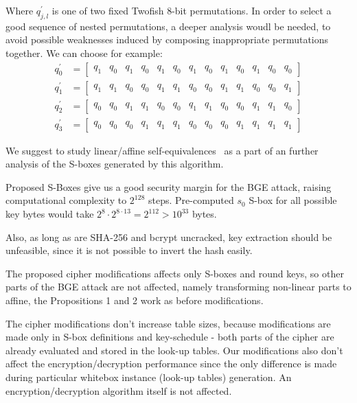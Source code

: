 \documentclass[11pt,oneside,final]{fithesis2}
\begin{document}
    Where $q^{\prime}_{j,l}$ is one of two fixed Twofish 8-bit permutations. In order to select a good sequence of nested permutations,
    a deeper analysis woudl be needed, to avoid possible weaknesses 
    induced by composing inappropriate permutations together. We can choose for example:
    \setcounter{MaxMatrixCols}{13}
    \begin{equation}
    \begin{aligned}
	q^{\prime}_{0} &= \begin{bmatrix}  q_1 & q_0 & q_1 & q_0 & q_1 & q_0 & q_1 & q_0 & q_1 & q_0 & q_1 & q_0 & q_0 \end{bmatrix}\\
	q^{\prime}_{1} &= \begin{bmatrix}  q_1 & q_1 & q_0 & q_0 & q_1 & q_1 & q_0 & q_0 & q_1 & q_1 & q_0 & q_0 & q_1 \end{bmatrix}\\
	q^{\prime}_{2} &= \begin{bmatrix}  q_0 & q_0 & q_1 & q_1 & q_0 & q_0 & q_1 & q_1 & q_0 & q_0 & q_1 & q_1 & q_0 \end{bmatrix}\\
	q^{\prime}_{3} &= \begin{bmatrix}  q_0 & q_0 & q_0 & q_1 & q_1 & q_1 & q_0 & q_0 & q_0 & q_1 & q_1 & q_1 & q_1 \end{bmatrix}
    \end{aligned}
    \end{equation}

    We suggest to study linear/affine self-equivalences~\citep{Biryukov:2003:TCL:1766171.1766175} as a part of an further analysis of the S-boxes generated by this algorithm.

    Proposed S-Boxes give us a good security margin for the BGE attack, raising computational complexity to $2^{128}$ steps. 
    Pre-computed $s_0$ S-box for all possible key bytes would take $2^8 \cdot 2^{8\cdot13} = 2^{112} > 10^{33}$ bytes. 

    Also, as long as are SHA-256 and bcrypt uncracked, key extraction should be unfeasible, since it is not possible to invert the hash easily. 

    The proposed cipher modifications affects only S-boxes and round keys, so other parts of the BGE attack are not affected, namely transforming non-linear parts
    to affine, the Propositions 1 and 2 work as before modifications. 

    The cipher modifications don't increase table sizes, because modifications are made only in S-box definitions and key-schedule - both 
    parts of the cipher are already evaluated and stored in the look-up tables. Our modifications also don't affect the encryption/decryption performance since the only
    difference is made during particular whitebox instance (look-up tables) generation. An encryption/decryption algorithm itself is not affected.
    
\end{document}
